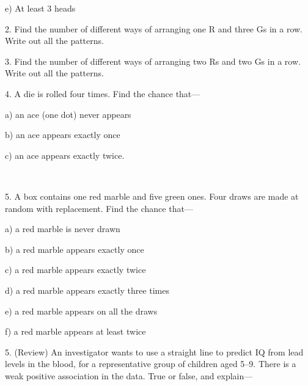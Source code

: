 \documentclass[10pt]{article}
\begin{document}
\hspace{20pt} e) At least 3 heads
\vspace{.4in}

2. Find the number of different ways of arranging one R and three Gs 
in a row.  Write out all the patterns.
\vspace{.4in}

3. Find the number of different ways of arranging two Rs and two Gs in a row.
Write out all the patterns.
\vspace{.4in}

4.  A die is rolled four times.  Find the chance that---

\hspace{20pt} a) an ace (one dot) never appears
\bigskip

\hspace{20pt} b) an ace appears exactly once
\bigskip

\hspace{20pt} c) an ace appears exactly twice.

\vfill
\eject
{\ }

5. A box contains one red marble and five green ones.  Four draws are made at 
random with replacement.  Find the chance that---

\hspace{20pt} a) a red marble is never drawn
\vspace{.4in}

\hspace{20pt} b) a red marble appears exactly once
\vspace{.4in}

\hspace{20pt} c) a red marble appears exactly twice
\vspace{.4in}

\hspace{20pt} d) a red marble appears exactly three times
\vspace{.4in}

\hspace{20pt} e) a red marble appears on all the draws
\vspace{.4in}

\hspace{20pt} f) a red marble appears at least twice
\vspace{.4in}
\vfill

5. (Review) An investigator wants to use a straight line to predict IQ from lead 
levels in the blood, for a representative group of children aged 5--9.  There is a weak
positive association in the data.  True or false, and explain---
\end{document}
